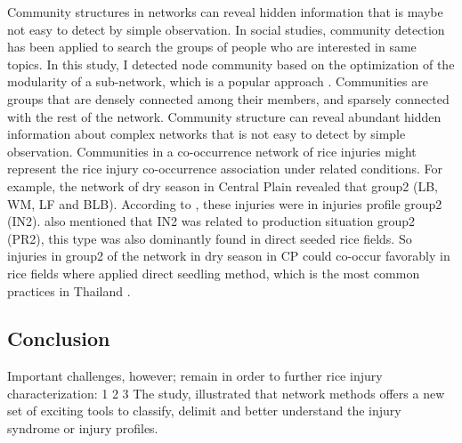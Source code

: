 Community structures in networks can reveal hidden information that is maybe not easy to detect by simple observation. In social studies, community detection has been applied to search the groups of people who are interested in same topics.   In this study, I detected node community based on the optimization of the modularity of a sub-network, which is a popular approach \cite{Liu_2014_Detecting}. Communities are groups that are densely connected among their members, and sparsely connected with the rest of the network. Community structure can reveal abundant hidden information about complex networks that is not easy to detect by simple observation. Communities in a co-occurrence network of rice injuries might represent the rice injury co-occurrence association under related conditions. For example, the network of dry season in Central Plain revealed that group2 (LB, WM, LF and BLB).  According to \citet{Savary_2000_Characterization}, these injuries were in injuries profile group2 (IN2). \citet{Savary_2000_Characterization} also mentioned that IN2 was related to production situation group2 (PR2), this type was also dominantly found in direct seeded rice fields. So injuries in group2 of the network in dry season in CP could co-occur favorably in rice fields where applied direct seedling method, which is the most common practices in Thailand \citep{IRRI_2013_Rice}. 
\subsection{Conclusion}


Important challenges, however; remain in order to further rice injury characterization:
1
2
3
The study, illustrated that network methods offers a new set of exciting tools to classify, delimit and better understand the injury syndrome or injury profiles.

